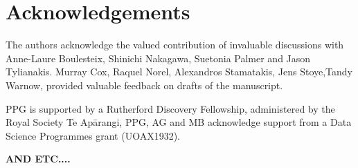 \documentclass[fleqn,10pt]{SelfArx} %
\begin{document}
\section*{Acknowledgements}

The authors acknowledge the valued contribution of invaluable
discussions with Anne-Laure Boulesteix, Shinichi Nakagawa, Suetonia
Palmer and Jason Tylianakis. Murray Cox, Raquel
Norel, Alexandros Stamatakis, Jens Stoye,Tandy Warnow, provided
valuable feedback on drafts of the manuscript.

PPG is supported by a Rutherford Discovery Fellowship,
administered by the Royal Society Te Ap\=arangi, 
PPG, AG and MB acknowledge support from a Data Science Programmes grant
(UOAX1932).

{\bf AND ETC....}



\end{document}
